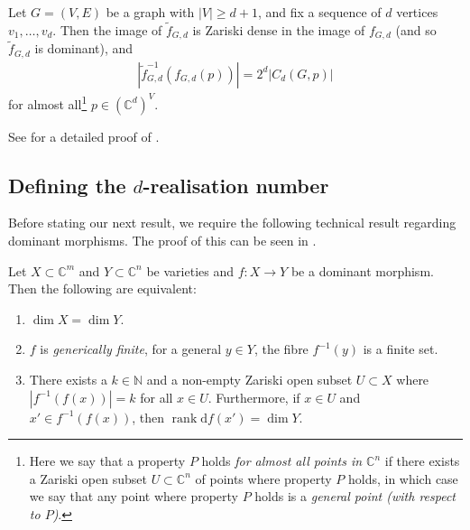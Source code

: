 \documentclass[ALCO]{cedram}
\DeclareMathOperator{\rank}{rank}
\newcommand{\diff}{\mathrm{d}}
\begin{document}
\begin{lemma}\label{l:xgd}
	Let $G=(V,E)$ be a graph with $|V| \geq d+1$,
	and fix a sequence of $d$ vertices $v_1,\ldots, v_d$.
	Then the image of $\tilde{f}_{G,d}$ is Zariski dense in the image of $f_{G,d}$ (and so $\tilde{f}_{G,d}$ is dominant),
	and
	\begin{align*}
		\left|\tilde{f}_{G,d}^{-1}\left(f_{G,d}(p) \right) \right| = 2^{d} |C_d(G,p)|
	\end{align*}
	for almost all\footnote{Here we say that a property $P$ holds \emph{for almost all points in $\mathbb{C}^n$} if there exists a Zariski open subset $U \subset \mathbb{C}^n$ of points where property $P$ holds, in which case we say that any point where property $P$ holds is a \emph{general point (with respect to $P$)}.} $p \in (\mathbb{C}^d)^V$.
\end{lemma}

See  for a detailed proof of .




\subsection{Defining the \texorpdfstring{$d$-realisation}{d-realisation} number}

Before stating our next result, we require the following technical result regarding dominant morphisms.
The proof of this can be seen in .

\begin{theorem}\label{t:deg}
	Let $X \subset \mathbb{C}^m$ and $Y \subset \mathbb{C}^n$ be varieties and $f:X \rightarrow Y$ be a dominant morphism.
	Then the following are equivalent:
	\begin{enumerate}
		\item \label{t:deg1} $\dim X = \dim Y$.
		\item \label{t:deg2} $f$ is \emph{generically finite},
		\ie for a general $y \in Y$,
		the fibre $f^{-1}(y)$ is a finite set.
		\item \label{t:deg3} There exists a $k \in \mathbb{N}$ and a non-empty Zariski open subset $U \subset X$ where $|f^{-1}(f(x))| = k$ for all $x \in U$.
		Furthermore,
		if $x \in U$ and $x' \in f^{-1}(f(x))$,
		then $\rank \diff f(x') = \dim Y$.
	\end{enumerate}
\end{theorem}
\end{document}
